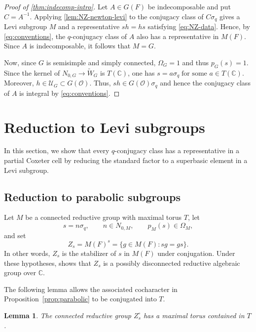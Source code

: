 \documentclass[11pt]{amsart}
\numberwithin{equation}{section}
\newtheorem{lemma}[lemma]{Lemma}
\theoremstyle{definition}
\theoremstyle{remark}
\begin{document}
\begin{proof}[Proof of \cref{thm:indecomp-intro}]
Let $A\in G(F)$ be indecomposable and put $C=A^{-1}$.  
Applying \cref{lem:NZ-newton-levi} to the conjugacy class of $C\sigma_q$ gives a Levi subgroup $M$ and a representative $sh=hs$ satisfying \eqref{eq:NZ-data}. Hence, by \eqref{eq:conventions}, the $q$-conjugacy class of $A$ also has a representative in $M(F)$. Since $A$ is indecomposable, it follows that $M=G$.

Now, since $G$ is semisimple and simply connected, $\Omega_G=1$ and thus $p_G(s)=1$. Since the kernel of $N_{0,G}\to\widetilde W_G$ is $T(\mathbb{C})$, one has
$s=a\sigma_q\;\text{for some }a\in T(\mathbb{C})$.
Moreover, $h\in\mathcal U_G\subset G(\mathcal O)$. Thus, $sh\in G(\mathcal{O})\sigma_q$ and hence the conjugacy class of $A$ is integral by \eqref{eq:conventions}. 
\end{proof}
\section{Reduction to Levi subgroups}
\label{sec:type-A}
In this section, we show that every $q$-conjugacy class has a representative in a partial Coxeter cell by reducing the standard factor to a superbasic element in a Levi subgroup.
\subsection{Reduction to parabolic subgroups}

Let $M$ be a connected reductive group with maximal torus $T$, let
\[
  s=n\sigma_q,\qquad n\in N_{0,M},\qquad p_M(s)\in\Omega_M,
\]
and set
\[
  Z_s=M(F)^s
  =\{g\in M(F):sg=gs\}.
\]
In other words, $Z_s$ is the stabilizer of $s$ in $M(F)$ under conjugation.
Under these hypotheses, \cite[Lemma~4.1]{NZ} shows that $Z_s$ is a possibly
disconnected reductive algebraic group over $\mathbb C$.

The following lemma allows the associated cocharacter in Proposition~\ref{prop:parabolic} to be conjugated into $T$.
\begin{lemma}\label{lem:constant-maximal-torus}
The connected reductive group $Z_s^\circ$ has a maximal torus contained in $T$.
\end{lemma}
\end{document}
